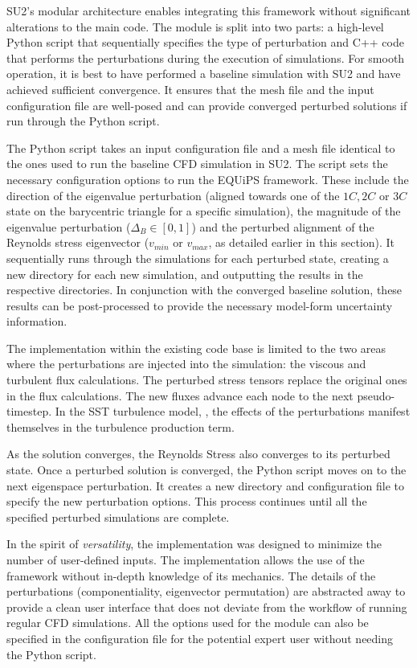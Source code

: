 SU2's modular architecture enables integrating this framework without significant alterations to the main code.
The module is split into two parts: a high-level Python script that sequentially specifies the type of perturbation and C++ code that performs the perturbations during the execution of simulations.
For smooth operation, it is best to have performed a baseline simulation with SU2 and have achieved sufficient convergence.
It ensures that the mesh file and the input configuration file are well-posed and can provide converged perturbed solutions if run through the Python script.

The Python script takes an input configuration file and a mesh file identical to the ones used to run the baseline CFD simulation in SU2.
The script sets the necessary configuration options to run the EQUiPS framework.
These include the direction of the eigenvalue perturbation (aligned towards one of the $1C, 2C$ or $3C$ state on the barycentric triangle for a specific simulation), the magnitude of the eigenvalue perturbation ($\Delta_{B} \in [0,1]$) and the perturbed alignment of the Reynolds stress eigenvector ($v_{min}$ or $v_{max}$, as detailed earlier in this section).
It sequentially runs through the simulations for each perturbed state, creating a new directory for each new simulation, and outputting the results in the respective directories.
In conjunction with the converged baseline solution, these results can be post-processed to provide the necessary model-form uncertainty information. 

The implementation within the existing code base is limited to the two areas where the perturbations are injected into the simulation: the viscous and turbulent flux calculations.
The perturbed stress tensors replace the original ones in the flux calculations.
The new fluxes advance each node to the next pseudo-timestep.
In the SST turbulence model, \cite{sst}, the effects of the perturbations manifest themselves in the turbulence production term. 

As the solution converges, the Reynolds Stress also converges to its perturbed state.
Once a perturbed solution is converged, the Python script moves on to the next eigenspace perturbation.
It creates a new directory and configuration file to specify the new perturbation options.
This process continues until all the specified perturbed simulations are complete. 

In the spirit of \textit{versatility}, the implementation was designed to minimize the number of user-defined inputs.
The implementation allows the use of the framework without in-depth knowledge of its mechanics.
The details of the perturbations (componentiality, eigenvector permutation) are abstracted away to provide a clean user interface that does not deviate from the workflow of running regular CFD simulations. All the options used for the module can also be specified in the configuration file for the potential expert user without needing the Python script. 